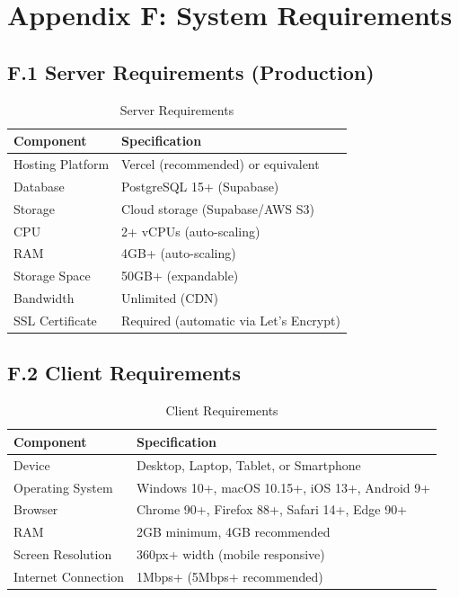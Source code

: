\section{Appendix F: System Requirements}

\subsection{F.1 Server Requirements (Production)}

\begin{table}[H]
\centering
\begin{tabular}{|l|l|}
\hline
\textbf{Component} & \textbf{Specification} \\
\hline
Hosting Platform & Vercel (recommended) or equivalent \\
Database & PostgreSQL 15+ (Supabase) \\
Storage & Cloud storage (Supabase/AWS S3) \\
CPU & 2+ vCPUs (auto-scaling) \\
RAM & 4GB+ (auto-scaling) \\
Storage Space & 50GB+ (expandable) \\
Bandwidth & Unlimited (CDN) \\
SSL Certificate & Required (automatic via Let's Encrypt) \\
\hline
\end{tabular}
\caption{Server Requirements}
\end{table}

\subsection{F.2 Client Requirements}

\begin{table}[H]
\centering
\begin{tabular}{|l|l|}
\hline
\textbf{Component} & \textbf{Specification} \\
\hline
Device & Desktop, Laptop, Tablet, or Smartphone \\
Operating System & Windows 10+, macOS 10.15+, iOS 13+, Android 9+ \\
Browser & Chrome 90+, Firefox 88+, Safari 14+, Edge 90+ \\
RAM & 2GB minimum, 4GB recommended \\
Screen Resolution & 360px+ width (mobile responsive) \\
Internet Connection & 1Mbps+ (5Mbps+ recommended) \\
\hline
\end{tabular}
\caption{Client Requirements}
\end{table}

